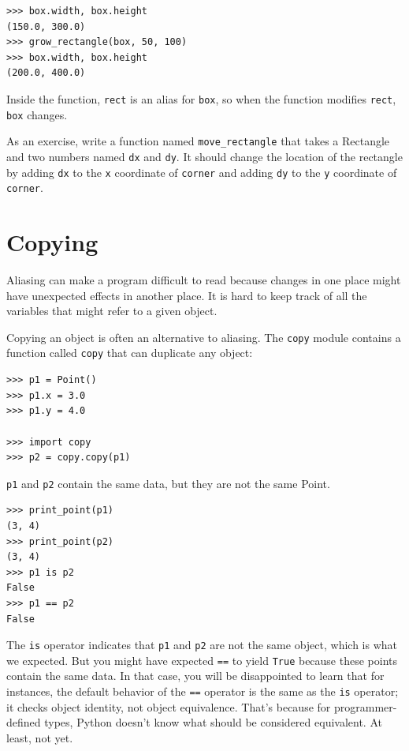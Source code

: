 \documentclass[10pt]{book}
\begin{document}
\begin{verbatim}
>>> box.width, box.height
(150.0, 300.0)
>>> grow_rectangle(box, 50, 100)
>>> box.width, box.height
(200.0, 400.0)
\end{verbatim}
%
Inside the function, {\tt rect} is an
alias for {\tt box}, so when the function modifies {\tt rect}, 
{\tt box} changes.

As an exercise, write a function named \verb"move_rectangle" that takes
a Rectangle and two numbers named {\tt dx} and {\tt dy}.  It
should change the location of the rectangle by adding {\tt dx}
to the {\tt x} coordinate of {\tt corner} and adding {\tt dy}
to the {\tt y} coordinate of {\tt corner}.


\section{Copying}
\label{copying}

Aliasing can make a program difficult to read because changes
in one place might have unexpected effects in another place.
It is hard to keep track of all the variables that might refer
to a given object.

Copying an object is often an alternative to aliasing.
The {\tt copy} module contains a function called {\tt copy} that
can duplicate any object:

\begin{verbatim}
>>> p1 = Point()
>>> p1.x = 3.0
>>> p1.y = 4.0

>>> import copy
>>> p2 = copy.copy(p1)
\end{verbatim}
%
{\tt p1} and {\tt p2} contain the same data, but they are
not the same Point.

\begin{verbatim}
>>> print_point(p1)
(3, 4)
>>> print_point(p2)
(3, 4)
>>> p1 is p2
False
>>> p1 == p2
False
\end{verbatim}
%
The {\tt is} operator indicates that {\tt p1} and {\tt p2} are not the
same object, which is what we expected.  But you might have expected
{\tt ==} to yield {\tt True} because these points contain the same
data.  In that case, you will be disappointed to learn that for
instances, the default behavior of the {\tt ==} operator is the same
as the {\tt is} operator; it checks object identity, not object
equivalence.  That's because for programmer-defined types, Python doesn't
know what should be considered equivalent.  At least, not yet.
\end{document}
